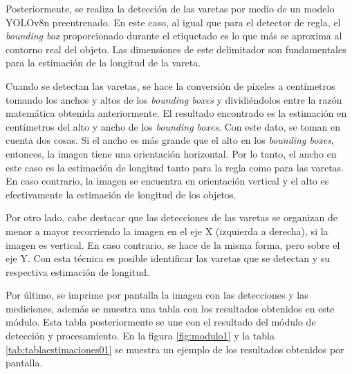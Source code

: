 Posteriormente, se realiza la detección de las varetas por medio de un modelo YOLOv8n preentrenado. En este caso, al igual que para el detector de regla, el \textit{bounding box} proporcionado durante el etiquetado es lo que más se aproxima al contorno real del objeto. Las dimensiones de este delimitador son fundamentales para la estimación de la longitud de la vareta. 

Cuando se detectan las varetas, se hace la conversión de píxeles a centímetros tomando los anchos y altos de los \textit{bounding boxes} y dividiéndolos entre la razón matemática obtenida anteriormente. El resultado encontrado es la estimación en centímetros del alto y ancho de los \textit{bounding boxes}. Con este dato, se toman en cuenta dos cosas. Si el ancho es más grande que el alto en los \textit{bounding boxes}, entonces, la imagen tiene una orientación horizontal. Por lo tanto, el ancho en este caso es la estimación de longitud tanto para la regla como para las varetas. En caso contrario, la imagen se encuentra en orientación vertical y el alto es efectivamente la estimación de longitud de los objetos.

Por otro lado, cabe destacar que las detecciones de las varetas se organizan de menor a mayor recorriendo la imagen en el eje X (izquierda a derecha), si la imagen es vertical. En caso contrario, se hace de la misma forma, pero sobre el eje Y. Con esta técnica es posible identificar las varetas que se detectan y su respectiva estimación de longitud.

Por último, se imprime por pantalla la imagen con las detecciones y las mediciones, además se muestra una tabla con los resultados obtenidos en este módulo. Esta tabla posteriormente se une con el resultado del módulo de detección y procesamiento. En la figura \ref{fig:modulo1} y la tabla \ref{tab:tablaestimaciones01} se muestra un ejemplo de los resultados obtenidos por pantalla.


